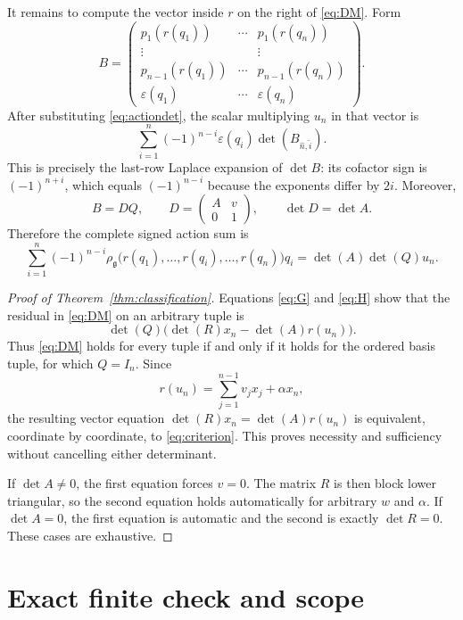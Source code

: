 \documentclass[11pt]{article}
\begin{document}
It remains to compute the vector inside $r$ on the right of
\eqref{eq:DM}.
Form
\[
 B=
 \begin{pmatrix}
 p_1(r(q_1))&\cdots&p_1(r(q_n))\\
 \vdots&&\vdots\\
 p_{n-1}(r(q_1))&\cdots&p_{n-1}(r(q_n))\\
 \varepsilon(q_1)&\cdots&\varepsilon(q_n)
 \end{pmatrix}.
\]
After substituting \eqref{eq:actiondet}, the scalar multiplying $u_n$ in
that vector is
\[
 \sum_{i=1}^n(-1)^{n-i}\varepsilon(q_i)
 \det(B_{\widehat n,\widehat i}).
\]
This is precisely the last-row Laplace expansion of $\det B$: its cofactor
sign is $(-1)^{n+i}$, which equals $(-1)^{n-i}$ because the exponents differ
by $2i$.  Moreover,
\[
 B=DQ,
 \qquad
 D=\begin{pmatrix}A&v\\0&1\end{pmatrix},
 \qquad
 \det D=\det A.
\]
Therefore the complete signed action sum is
\begin{equation}\label{eq:H}
 \sum_{i=1}^n(-1)^{n-i}
 \rho_{\mathfrak g}\bigl(r(q_1),\ldots,\widehat{r(q_i)},\ldots,
 r(q_n)\bigr)q_i
 =\det(A)\det(Q)u_n.
\end{equation}

\begin{proof}[Proof of Theorem~\ref{thm:classification}]
Equations \eqref{eq:G} and \eqref{eq:H} show that the residual in
\eqref{eq:DM} on an arbitrary tuple is
\[
 \det(Q)\bigl(\det(R)x_n-\det(A)r(u_n)\bigr).
\]
Thus \eqref{eq:DM} holds for every tuple if and only if it holds for the
ordered basis tuple, for which $Q=I_n$.  Since
\[
 r(u_n)=\sum_{j=1}^{n-1}v_jx_j+\alpha x_n,
\]
the resulting vector equation
$\det(R)x_n=\det(A)r(u_n)$ is equivalent, coordinate by coordinate, to
\eqref{eq:criterion}.  This proves necessity and sufficiency without
cancelling either determinant.

If $\det A\ne0$, the first equation forces $v=0$.  The matrix $R$ is then
block lower triangular, so the second equation holds automatically for
arbitrary $w$ and $\alpha$.  If $\det A=0$, the first equation is automatic
and the second is exactly $\det R=0$.  These cases are exhaustive.
\end{proof}

\section{Exact finite check and scope}
\end{document}
